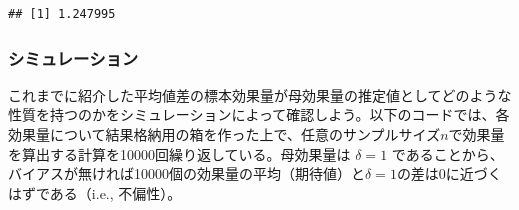 \documentclass[
  ja=standard, xelatex, base=12pt]{bxjsreport}
\begin{document}
\begin{verbatim}
## [1] 1.247995
\end{verbatim}

\hypertarget{ux30b7ux30dfux30e5ux30ecux30fcux30b7ux30e7ux30f3-1}{%
\subsubsection{シミュレーション}\label{ux30b7ux30dfux30e5ux30ecux30fcux30b7ux30e7ux30f3-1}}

これまでに紹介した平均値差の標本効果量が母効果量の推定値としてどのような性質を持つのかをシミュレーションによって確認しよう。以下のコードでは、各効果量について結果格納用の箱を作った上で、任意のサンプルサイズ\(n\)で効果量を算出する計算を10000回繰り返している。母効果量は \(\delta=1\) であることから、バイアスが無ければ10000個の効果量の平均（期待値）と\(\delta=1\)の差は0に近づくはずである（i.e., 不偏性）。
\end{document}
